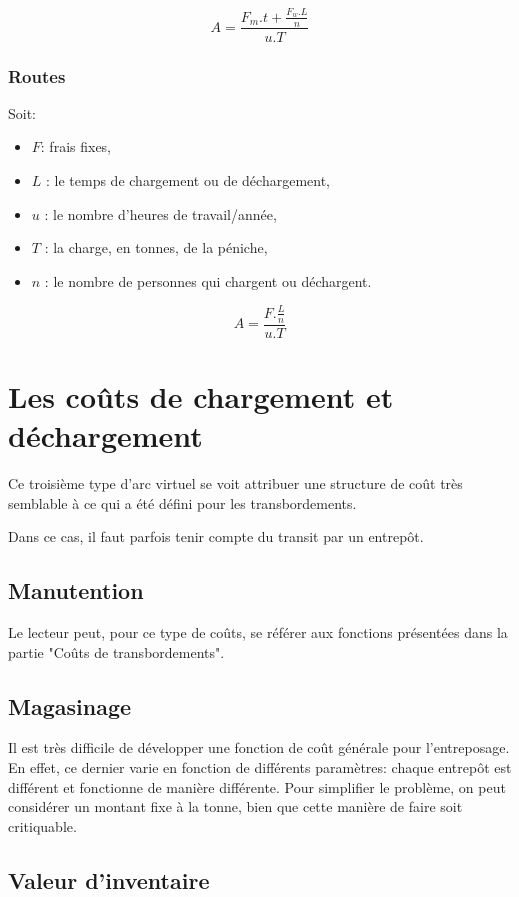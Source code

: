 $$A=\frac{F_m.t+\frac{F_w.L}{n}}{u.T}$$

\subsubsection{Routes}

Soit:

\begin{itemize}
\item $F$: frais fixes,
\item $L$ : le temps de chargement ou de déchargement,
\item $u$ : le nombre d'heures de travail/année,
\item $T$ : la charge, en tonnes, de la péniche,
\item $n$ : le nombre de personnes qui chargent ou déchargent.
\end{itemize}


$$A=\frac{F.\frac{L}{n}}{u.T}$$


\section{Les co\^uts de chargement et d\'echargement}

Ce troisième type d'arc virtuel se voit attribuer une structure de
coût très semblable à ce qui a été défini pour les transbordements.

Dans ce cas, il faut parfois tenir compte du transit par un
entrepôt.

\subsection{Manutention}

Le lecteur peut, pour ce type de coûts, se référer aux fonctions
présentées dans la partie "Coûts de transbordements".

\subsection{Magasinage}

Il est très difficile de développer une fonction de coût générale
pour l'entreposage. En effet, ce dernier varie en fonction de
différents paramètres: chaque entrepôt est différent et fonctionne
de manière différente. Pour simplifier le problème, on peut
considérer un montant fixe à la tonne, bien que cette manière de
faire soit critiquable.

\subsection{Valeur d'inventaire}

